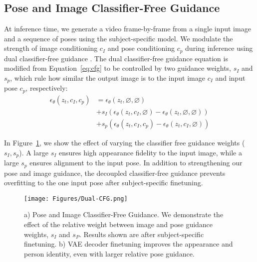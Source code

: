     \subsection{Pose and Image Classifier-Free Guidance}
    \label{sec:cfg}
        At inference time, we generate a video frame-by-frame from a single input image and a sequence of poses using the subject-specific model. We modulate the strength of image conditioning $c_I$ and pose conditioning $c_p$ during inference using dual classifier-free guidance \cite{instruct_pix2pix}. The dual classifier-free guidance equation is modified from Equation~\ref{eq:cfg} to be controlled by two guidance weights, $s_I$ and $s_p$, which rule how similar the output image is to the input image $c_I$ and input pose $c_p$, respectively:
        \begin{equation}
        \begin{aligned}
            \epsilon_{\theta}(z_t, c_I, c_p) & = \epsilon_{\theta}(z_t, \varnothing, \varnothing) \\
                            & + s_I (\epsilon_{\theta}(z_t, c_I, \varnothing) - \epsilon_{\theta}(z_t, \varnothing, \varnothing)) \\
                            & + s_p (\epsilon_{\theta}(z_t, c_I, c_p) - \epsilon_{\theta}(z_t, c_I, \varnothing))
        \end{aligned}
        \label{eq:cfg-equation}
        \end{equation}
        
        In Figure~\ref{fig:dual-cfg}, we show the effect of varying the classifier free guidance weights ($s_I, s_p$). A large $s_I$ ensures high appearance fidelity to the input image, while a large $s_p$ ensures alignment to the input pose. In addition to strengthening our pose and image guidance, the decoupled classifier-free guidance prevents overfitting to the one input pose after subject-specific finetuning.

    \begin{figure}[t]
            \begin{center}
                \texttt{[image: Figures/Dual-CFG.png]}
            \end{center}
           \caption{ a) Pose and Image Classifier-Free Guidance. We demonstrate the effect of the relative weight between image and pose guidance weights, $s_I$ and $s_P$. Results shown are after subject-specific finetuning. b) VAE decoder finetuning improves the appearance and person identity, even with larger relative pose guidance. }
        \label{fig:dual-cfg}
        \end{figure}

